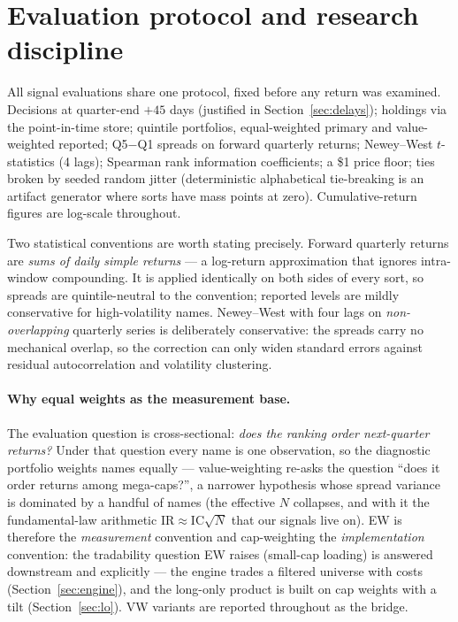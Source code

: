 \section{Evaluation protocol and research discipline}
\label{sec:protocol}

All signal evaluations share one protocol, fixed before any return
was examined. Decisions at quarter-end $+45$ days (justified in
Section~\ref{sec:delays}); holdings via the point-in-time store;
quintile portfolios, equal-weighted primary and value-weighted
reported; Q5$-$Q1 spreads on forward quarterly returns;
Newey--West $t$-statistics (4 lags); Spearman rank information
coefficients; a \$1 price floor; ties broken by seeded random jitter
(deterministic alphabetical tie-breaking is an artifact generator
where sorts have mass points at zero). Cumulative-return figures are
log-scale throughout.

Two statistical conventions are worth stating precisely. Forward
quarterly returns are \emph{sums of daily simple returns} --- a
log-return approximation that ignores intra-window compounding. It is
applied identically on both sides of every sort, so spreads are
quintile-neutral to the convention; reported levels are mildly
conservative for high-volatility names. Newey--West with four lags on
\emph{non-overlapping} quarterly series is deliberately conservative:
the spreads carry no mechanical overlap, so the correction can only
widen standard errors against residual autocorrelation and
volatility clustering.

\paragraph{Why equal weights as the measurement base.}
The evaluation question is cross-sectional: \emph{does the ranking
order next-quarter returns?} Under that question every name is one
observation, so the diagnostic portfolio weights names equally ---
value-weighting re-asks the question ``does it order returns among
mega-caps?'', a narrower hypothesis whose spread variance is
dominated by a handful of names (the effective $N$ collapses, and
with it the fundamental-law arithmetic $\mathrm{IR}\approx
\mathrm{IC}\sqrt{N}$ that our signals live on). EW is therefore the
\emph{measurement} convention and cap-weighting the
\emph{implementation} convention: the tradability question EW raises
(small-cap loading) is answered downstream and explicitly --- the
engine trades a filtered universe with costs
(Section~\ref{sec:engine}), and the long-only product is built on
cap weights with a tilt (Section~\ref{sec:lo}). VW variants are
reported throughout as the bridge.

